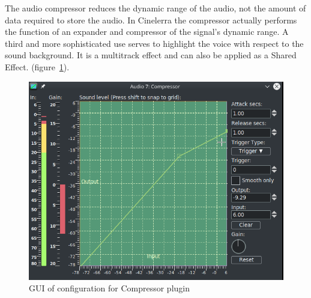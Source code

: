 The audio compressor reduces the dynamic range of the audio, not the amount of data required to store the audio. In Cinelerra the compressor actually performs the function of an expander and compressor of the signal's dynamic range. A third and more sophisticated use serves to highlight the voice with respect to the sound background. It is a multitrack effect and can also be applied as a Shared Effect. (figure~\ref{fig:compressor}).

\begin{figure}[htpb]
    \centering
    \includegraphics[width=0.7\linewidth]{images/compressor.png}
    \caption{GUI of configuration for Compressor plugin}
    \label{fig:compressor}
\end{figure}

